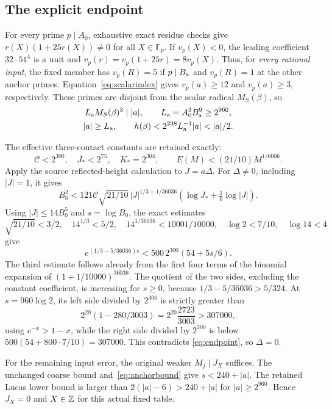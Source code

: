 \documentclass[11pt]{article}
\theoremstyle{remark}\newtheorem{remark}[theorem]{Remark}
\begin{document}
\subsection*{The explicit endpoint}
For every prime $p\mid A_0$, exhaustive exact residue checks give
$r(X)(1+25r(X))\ne0$ for all $X\in\mathbb F_p$. If $v_p(X)<0$,
the leading coefficient $32\cdot51^4$ is a unit and
$v_p(r)=v_p(1+25r)=8v_p(X)$. Thus, for \emph{every rational input},
the fixed member has $v_p(R)=5$ if $p\mid B_{\rm a}$ and
$v_p(R)=1$ at the other anchor primes. Equation~\eqref{eq:scalarindex}
gives $v_p(a)\ge12$ and $v_p(a)\ge3$, respectively. These primes
are disjoint from the scalar radical $M_S(\beta)$, so
\begin{equation}\label{eq:anchorbound}
 \begin{gathered}
 L_{\rm a}M_S(\beta)^3\mid |a|,\qquad
 L_{\rm a}=A_0^3B_{\rm a}^9\ge2^{960},\\
 |a|\ge L_{\rm a},\qquad
 h(\beta)<2^{238}L_{\rm a}^{-1}|a|<|a|/2.
 \end{gathered}
\end{equation}

The effective three-contact constants are retained exactly:
\[
 \mathcal C<2^{300},\quad J_*<2^{75},\quad K_*=2^{304},
 \qquad E(M)<(21/10)M^{1/6006}.
\]
Apply the source reflected-height calculation to $J=a\Delta$.
For $\Delta\ne0$, including $|J|=1$, it gives
\[
 B_0^2<121\mathcal C\sqrt{21/10}\,
 |J|^{1/3+1/36036}
 \left(\log J_*+\tfrac16\log|J|\right).
\]
Using $|J|\le14B_0^5$ and $s=\log B_0$, the exact estimates
\[
 \sqrt{21/10}<3/2,\quad 14^{1/3}<5/2,\quad
 14^{1/36036}<10001/10000,\quad \log2<7/10,\quad\log14<4
\]
give
\begin{equation}\label{eq:endpoint}
       e^{(1/3-5/36036)s}<500\,2^{300}(54+5s/6).
\end{equation}
The third estimate follows already from the first four terms of
the binomial expansion of $(1+1/10000)^{36036}$.
The quotient of the two sides, excluding the constant coefficient,
is increasing for $s\ge0$, because
$1/3-5/36036>5/324$. At $s=960\log2$, its left side divided
by $2^{300}$ is strictly greater than
\[
 2^{20}(1-280/3003)=2^{20}\frac{2723}{3003}>307000,
\]
using $e^{-x}>1-x$, while the right side divided by $2^{300}$
is below $500(54+800\cdot7/10)=307000$. This contradicts
\eqref{eq:endpoint}, so $\Delta=0$.

For the remaining input error, the original weaker $M_j\mid J_X$
suffices. The unchanged coarse bound and~\eqref{eq:anchorbound}
give $s<240+|a|$. The retained Lucas lower bound is larger than
$2(|a|-6)>240+|a|$ for $|a|\ge2^{960}$. Hence $J_X=0$ and
$X\in\mathbb Z$ for this actual fixed table.
\end{document}
